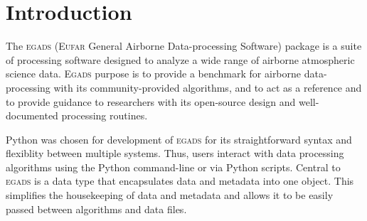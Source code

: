 \documentclass[a4paper,11pt]{report}
\newcommand{\egads}{\textsc{egads} }
\newcommand{\Egads}{\textsc{Egads} }
\begin{document}
\renewcommand{\thepage}{\roman{page}}






\tableofcontents
\pagebreak


\renewcommand{\thepage}{\arabic{page}}
\setcounter{page}{1}

\chapter{Introduction}

The \egads (\textsc{Eufar} General Airborne Data-processing Software) package is
a suite of processing software designed to analyze a wide range of airborne atmospheric science
data. \Egads purpose is to provide a benchmark for airborne data-processing with its community-provided
algorithms, and to act as a reference and to provide guidance to researchers with its open-source design
and well-documented processing routines.

Python was chosen for development of \egads for its straightforward syntax and flexiblity between multiple systems.
Thus, users interact with data processing algorithms using the Python command-line or via Python scripts. 
Central to \egads is a data type that encapsulates data and metadata into one object. 
This simplifies the housekeeping of data and metadata and allows it to be easily passed between algorithms and data files.



\end{document}
